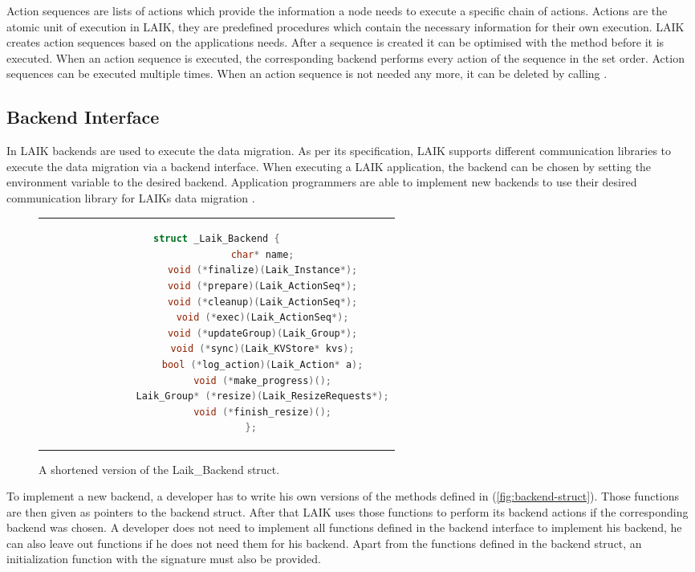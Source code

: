 Action sequences are lists of actions which provide the information a node needs to execute a specific chain of actions. 
Actions are the atomic unit of execution in LAIK, they are predefined procedures which contain the necessary information for their own execution. 
LAIK creates action sequences based on the applications needs. 
After a sequence is created it can be optimised with the method  before it is executed. 
When an action sequence is executed, the corresponding backend performs every action of the sequence in the set order. 
Action sequences can be executed multiple times. 
When an action sequence is not needed any more, it can be deleted by calling .

\subsection{Backend Interface}

In LAIK backends are used to execute the data migration. 
As per its specification, LAIK supports different communication libraries to execute the data migration via a backend interface\cite{laik-paper}. 
When executing a LAIK application, the backend can be chosen by setting the environment variable  to the desired backend. Application programmers are able to implement new backends to use their desired communication library for LAIKs data migration \cite{laik-paper}.

\begin{figure}[htpb]
	\centering
	\begin{tabular}{c}
		\begin{lstlisting}[language=C++]
			struct _Laik_Backend {
				char* name;
				void (*finalize)(Laik_Instance*);
				void (*prepare)(Laik_ActionSeq*);
				void (*cleanup)(Laik_ActionSeq*);
				void (*exec)(Laik_ActionSeq*);
				void (*updateGroup)(Laik_Group*);
				void (*sync)(Laik_KVStore* kvs);
				bool (*log_action)(Laik_Action* a);
				void (*make_progress)();
				Laik_Group* (*resize)(Laik_ResizeRequests*);
				void (*finish_resize)();
			};
		\end{lstlisting}
	\end{tabular}
	\caption[LAIK-Backend struct]{A shortened version of the Laik\_Backend struct.}
	\label{fig:backend-struct}
\end{figure}

To implement a new backend, a developer has to write his own versions of the methods defined in  (\autoref{fig:backend-struct}). 
Those functions are then given as pointers to the backend struct. After that LAIK uses those functions to perform its backend actions if the corresponding backend was chosen. 
A developer does not need to implement all functions defined in the backend interface to implement his backend, he can also leave out functions if he does not need them for his backend. 
Apart from the functions defined in the backend struct, an initialization function with the signature  must also be provided. 

